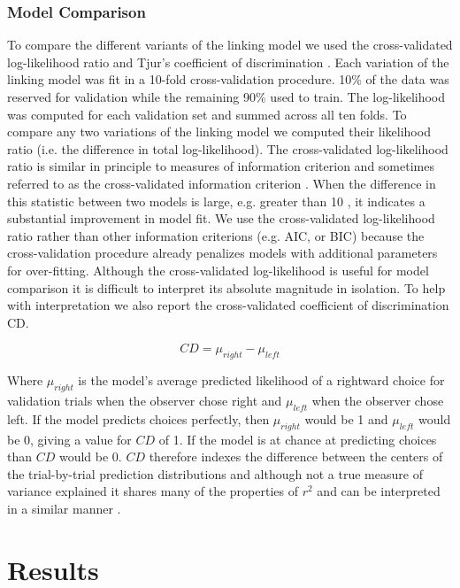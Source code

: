 \documentclass{report}
\begin{document}
\subsubsection{Model Comparison}

To compare the different variants of the linking model we used the cross-validated log-likelihood ratio and Tjur’s coefficient of discrimination \citep{Tjur2009-az}. Each variation of the linking model was fit in a 10-fold cross-validation procedure. 10\% of the data was reserved for validation while the remaining 90\% used to train. The log-likelihood was computed for each validation set and summed across all ten folds. To compare any two variations of the linking model we computed their likelihood ratio (i.e. the difference in total log-likelihood). The cross-validated log-likelihood ratio is similar in principle to measures of information criterion and sometimes referred to as the cross-validated information criterion \citep{McLachlan2000-bd}. When the difference in this statistic between two models is large, e.g. greater than 10 \citep{Burnham2004-za}, it indicates a substantial improvement in model fit. We use the cross-validated log-likelihood ratio rather than other information criterions (e.g. AIC, or BIC) because the cross-validation procedure already penalizes models with additional parameters for over-fitting. Although the cross-validated log-likelihood is useful for model comparison it is difficult to interpret its absolute magnitude in isolation. To help with interpretation we also report the cross-validated coefficient of discrimination CD. 

\begin{equation}
    CD=\mu_{right}-\mu_{left}
\end{equation}

Where $\mu_{right}$ is the model’s average predicted likelihood of a rightward choice for validation trials when the observer chose right and $\mu_{left}$ when the observer chose left. If the model predicts choices perfectly, then $\mu_{right}$ would be 1 and $\mu_{left}$ would be 0, giving a value for $CD$ of 1. If the model is at chance at predicting choices than $CD$ would be 0. $CD$ therefore indexes the difference between the centers of the trial-by-trial prediction distributions and although not a true measure of variance explained it shares many of the properties of $r^2$ and can be interpreted in a similar manner \citep{Tjur2009-az}.

\section{Results}
\end{document}
